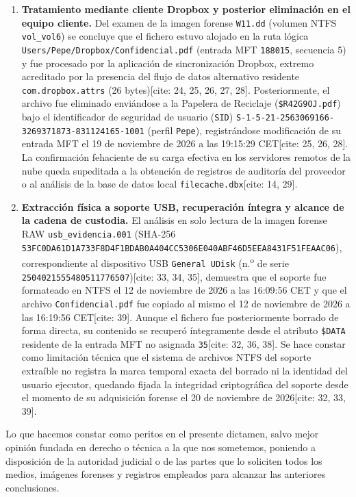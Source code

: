 \begin{enumerate}[leftmargin=1.6em, itemsep=0.7em]
	\item \textbf{Tratamiento mediante cliente Dropbox y posterior eliminación en el equipo cliente.}
	Del examen de la imagen forense \texttt{W11.dd} (volumen NTFS \texttt{vol\_vol6}) se concluye que el fichero estuvo alojado en la ruta lógica \texttt{Users/Pepe/Dropbox/Confidencial.pdf} (entrada MFT \texttt{188015}, secuencia 5) y fue procesado por la aplicación de sincronización Dropbox, extremo acreditado por la presencia del flujo de datos alternativo residente \texttt{com.dropbox.attrs} (26 bytes)[cite: 24, 25, 26, 27, 28]. Posteriormente, el archivo fue eliminado enviándose a la Papelera de Reciclaje (\texttt{\$R42G9OJ.pdf}) bajo el identificador de seguridad de usuario (\texttt{SID}) \texttt{S-1-5-21-2563069166-3269371873-831124165-1001} (perfil \texttt{Pepe}), registrándose modificación de su entrada MFT el 19 de noviembre de 2026 a las 19:15:29 CET[cite: 25, 26, 28]. La confirmación fehaciente de su carga efectiva en los servidores remotos de la nube queda supeditada a la obtención de registros de auditoría del proveedor o al análisis de la base de datos local \texttt{filecache.dbx}[cite: 14, 29].
	
	\item \textbf{Extracción física a soporte USB, recuperación íntegra y alcance de la cadena de custodia.}
	El análisis en solo lectura de la imagen forense RAW \texttt{usb\_evidencia.001} (SHA-256 \texttt{53FC0DA61D1A733F8D4F1BDAB0A404CC5306E040ABF46D5EEA8431F51FEAAC06}), correspondiente al dispositivo USB \texttt{General UDisk} (n.\textsuperscript{o} de serie \texttt{2504021555480511776507})[cite: 33, 34, 35], demuestra que el soporte fue formateado en NTFS el 12 de noviembre de 2026 a las 16:09:56 CET y que el archivo \texttt{Confidencial.pdf} fue copiado al mismo el 12 de noviembre de 2026 a las 16:19:56 CET[cite: 39]. Aunque el fichero fue posteriormente borrado de forma directa, su contenido se recuperó íntegramente desde el atributo \texttt{\$DATA} residente de la entrada MFT no asignada \texttt{35}[cite: 32, 36, 38]. Se hace constar como limitación técnica que el sistema de archivos NTFS del soporte extraíble no registra la marca temporal exacta del borrado ni la identidad del usuario ejecutor, quedando fijada la integridad criptográfica del soporte desde el momento de su adquisición forense el 20 de noviembre de 2026[cite: 32, 33, 39].
\end{enumerate}

\vspace{0.4cm}
Lo que hacemos constar como peritos en el presente dictamen, salvo mejor opinión fundada en derecho o técnica a la que nos sometemos, poniendo a disposición de la autoridad judicial o de las partes que lo soliciten todos los medios, imágenes forenses y registros empleados para alcanzar las anteriores conclusiones.

